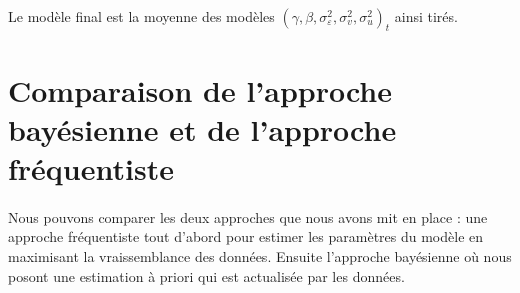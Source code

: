 \documentclass{article}
\theoremstyle{definition}
\theoremstyle{remark}
\begin{document}
{\paragraph{}
Le modèle final est la moyenne des modèles $\left(\gamma, \beta, \sigma_{\varepsilon}^{2}, \sigma_{v}^{2}, \sigma_{u}^{2}\right)_t$ 
ainsi tirés.

\newpage




	








\section{Comparaison de l'approche bayésienne et de l'approche fréquentiste}
\paragraph{}
Nous pouvons comparer les deux approches que nous avons mit en place : une approche fréquentiste tout d'abord pour estimer les paramètres du modèle
en maximisant la vraissemblance des données. Ensuite l'approche bayésienne où nous posont une estimation à priori qui est actualisée
par les données.
}
\end{document}
